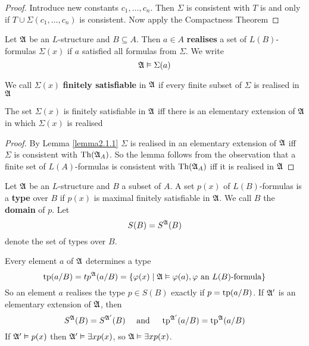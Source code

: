 \documentclass[11pt]{article}
\begin{document}
\begin{proof}
Introduce new constants \(c_1,\dots,c_n\). Then \(\Sigma\) is consistent with \(T\) is
and only if \(T\cup\Sigma(c_1,\dots,c_n)\) is consistent. Now apply the
Compactness Theorem
\end{proof}

\begin{definition}[]
Let \(\mathfrak{A}\) be an \(L\)-structure and \(B\subseteq A\). Then \(a\in A\)
\textbf{realises} a set of \(L(B)\)-formulas \(\Sigma(x)\) if \(a\) satisfied all formulas
from \(\Sigma\). We write 
\begin{equation*}
\mathfrak{A}\vDash\Sigma(a)
\end{equation*}

We call \(\Sigma(x)\) \textbf{finitely satisfiable} in \(\mathfrak{A}\) if every finite subset of \(\Sigma\)
is realised in \(\mathfrak{A}\)
\end{definition}

\begin{lemma}[]
\label{lemma2.2.7}
The set \(\Sigma(x)\) is finitely satisfiable in \(\mathfrak{A}\) iff there is an
elementary extension of \(\mathfrak{A}\) in which \(\Sigma(x)\) is realised
\end{lemma}

\begin{proof}
By Lemma \ref{lemma2.1.1} \(\Sigma\) is realised in an elementary extension of \(\mathfrak{A}\)
iff \(\Sigma\) is consistent with \(\operatorname{Th}(\mathfrak{A}_A)\). So the lemma follows from the
observation that a finite set of \(L(A)\)-formulas is consistent with
\(\operatorname{Th}(\mathfrak{A}_A)\) iff it is realised in \(\mathfrak{A}\)
\end{proof}

\begin{definition}[]
Let \(\mathfrak{A}\) be an \(L\)-structure and \(B\) a subset of \(A\). A set \(p(x)\)
of \(L(B)\)-formulas is a \textbf{type} over \(B\) if \(p(x)\) is maximal finitely
satisfiable in \(\mathfrak{A}\). We call \(B\) the \textbf{domain} of \(p\). Let
\begin{equation*}
S(B)=S^{\mathfrak{A}}(B)
\end{equation*}
denote the set of types over \(B\).
\end{definition}

Every element \(a\) of \(\mathfrak{A}\) determines a type
\begin{equation*}
\operatorname{tp}(a/B)=tp^{\mathfrak{A}}(a/B)=\{\varphi(x)\mid\mathfrak{A}\vDash\varphi(a),\varphi\text{ an $L(B)$-formula}\}
\end{equation*}
So an element \(a\) realises the type \(p\in S(B)\) exactly if
\(p=\operatorname{tp}(a/B)\). If \(\mathfrak{A}'\) is an elementary extension of \(\mathfrak{A}\), then
\begin{equation*}
S^{\mathfrak{A}}(B)=S^{\mathfrak{A}'}(B)\quad\text{ and }\quad
\operatorname{tp}^{\mathfrak{A}'}(a/B)=\operatorname{tp}^{\mathfrak{A}}(a/B)
\end{equation*}
If \(\mathfrak{A}'\vDash p(x)\) then \(\mathfrak{A}'\vDash\exists xp(x)\), so
\(\mathfrak{A}\vDash\exists xp(x)\).
\end{document}
